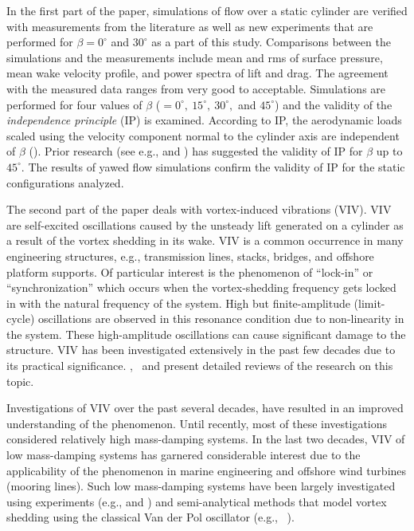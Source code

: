 In the first part of the paper, simulations of flow over a static cylinder are
verified with measurements from the literature as well as new experiments that
are performed for $\beta=0^\circ$ and $30^\circ$ as a part of this study.
Comparisons between the simulations and the measurements include mean and rms
of surface pressure, mean wake velocity profile, and power spectra of lift and
drag. The agreement with the measured data ranges from very good to acceptable.
Simulations are performed for four values of $\beta$
($=0^\circ,~15^\circ,~30^\circ,$ and $45^\circ$) and the validity of the {\em
independence principle} (IP) is examined. According to IP, the aerodynamic
loads scaled using the velocity component normal to the cylinder axis are
independent of $\beta$ (\citet{zdravkovich2003flow}). Prior research (see e.g.,
\citet{franzini2009experimental} and \citet{zhao2009direct}) has suggested the
validity of IP for $\beta$ up to $45^\circ$. The results of yawed flow
simulations confirm the validity of IP for the static configurations analyzed.

The second part of the paper deals with vortex-induced vibrations (VIV). VIV
are self-excited oscillations caused by the unsteady lift generated on a
cylinder as a result of the vortex shedding in its wake. VIV is a common
occurrence in many engineering structures, e.g., transmission lines, stacks,
bridges, and offshore platform supports. Of particular interest is the
phenomenon of ``lock-in'' or ``synchronization'' which occurs when the
vortex-shedding frequency gets locked in with the natural frequency of the
system. High but finite-amplitude (limit-cycle) oscillations are observed in
this resonance condition due to non-linearity in the system. These
high-amplitude oscillations can cause significant damage to the structure. VIV
has been investigated extensively in the past few decades due to its practical
significance. \cite{bearman1984vortex},~\cite{sarpkaya2004critical} and
\cite{williamson2004vortex} present detailed reviews of the research on this
topic.

Investigations of VIV over the past several decades, have resulted in an
improved understanding of the phenomenon. Until recently, most of these
investigations considered relatively high mass-damping systems. In the last
two decades, VIV of low mass-damping systems has garnered considerable
interest due to the applicability of the phenomenon in marine engineering and
offshore wind turbines (mooring lines). Such low mass-damping systems have been
largely investigated using experiments (e.g., \citet{jain2013vortex} and
\citet{franzini2013one}) and semi-analytical methods that model vortex shedding
using the classical Van der Pol oscillator (e.g., ~\cite{xu2008high}). 

